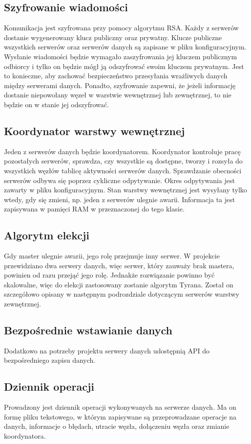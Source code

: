 \subsection{Szyfrowanie wiadomości}
Komunikacja jest szyfrowana przy pomocy algorytmu RSA. Każdy z serwerów dostanie wygenerowany klucz publiczny oraz prywatny. Klucze publiczne wszystkich serwerów oraz serwerów danych są zapisane w pliku konfiguracyjnym. Wysłanie wiadomości będzie wymagało zaszyfrowania jej kluczem publicznym odbiorcy i tylko on będzie mógł ją odszyfrować swoim kluczem prywatnym. Jest to konieczne, aby zachować bezpieczeństwo przesyłania wrażliwych danych między serwerami danych. Ponadto, szyfrowanie zapewni, że jeżeli informację dostanie niepowołany węzeł w warstwie wewnętrznej lub zewnętrznej, to nie będzie on w stanie jej odszyfrować.

\subsection{Koordynator warstwy wewnętrznej}
Jeden z serwerów danych będzie koordynatorem. Koordynator kontroluje pracę pozostałych serwerów, sprawdza, czy wszystkie są dostępne, tworzy i rozsyła do wszystkich węzłów tablicę aktywności serwerów danych. Sprawdzanie obecności serwerów odbywa się poprzez cykliczne odpytywanie. Okres odpytywania jest zawarty w pliku konfiguracyjnym. Stan warstwy wewnętrznej jest wysyłany tylko wtedy, gdy się zmieni, np. jeden z serwerów ulegnie awarii. Informacja ta jest zapisywana w pamięci RAM w przeznaczonej do tego klasie.

\subsection{Algorytm elekcji}
Gdy master ulegnie awarii, jego rolę przejmuje inny serwer. W projekcie przewidziano dwa serwery danych, więc serwer, który zauważy brak mastera, powinien od razu przejąć jego rolę. Jednakże rozwiązanie powinno być skalowalne, więc do elekcji zastosowany zostanie algorytm Tyrana. Został on szczegółowo opisany w następnym podrozdziale dotyczącym serwerów warstwy zewnętrznej.

\subsection{Bezpośrednie wstawianie danych}
Dodatkowo na potrzeby projektu serwery danych udostępnią API do bezpośredniego zapisu danych.

\subsection{Dziennik operacji}
Prowadzony jest dziennik operacji wykonywanych na serwerze danych. Ma on formę pliku tekstowego, w którym zapisywane są przeprowadzane operacje na danych, informacje o błędach, utracie węzła, dołączeniu węzła oraz zmianie koordynatora.


